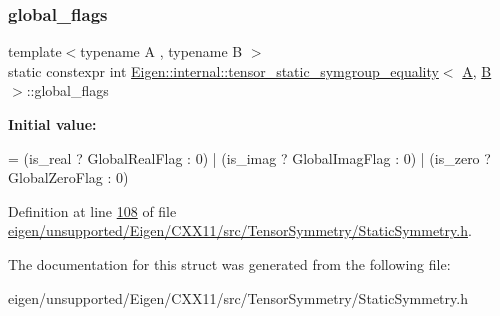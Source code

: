 \subsubsection{\texorpdfstring{global\+\_\+flags}{global\_flags}}
{\footnotesize\ttfamily template$<$typename A , typename B $>$ \\
static constexpr int \hyperlink{struct_eigen_1_1internal_1_1tensor__static__symgroup__equality}{Eigen\+::internal\+::tensor\+\_\+static\+\_\+symgroup\+\_\+equality}$<$ \hyperlink{group___core___module_class_eigen_1_1_matrix}{A}, \hyperlink{group___core___module_class_eigen_1_1_matrix}{B} $>$\+::global\+\_\+flags\hspace{0.3cm}{\ttfamily [static]}}

{\bfseries Initial value\+:}
\begin{DoxyCode}
= 
      (is\_real ? GlobalRealFlag : 0) |
      (is\_imag ? GlobalImagFlag : 0) |
      (is\_zero ? GlobalZeroFlag : 0)
\end{DoxyCode}


Definition at line \hyperlink{eigen_2unsupported_2_eigen_2_c_x_x11_2src_2_tensor_symmetry_2_static_symmetry_8h_source_l00108}{108} of file \hyperlink{eigen_2unsupported_2_eigen_2_c_x_x11_2src_2_tensor_symmetry_2_static_symmetry_8h_source}{eigen/unsupported/\+Eigen/\+C\+X\+X11/src/\+Tensor\+Symmetry/\+Static\+Symmetry.\+h}.



The documentation for this struct was generated from the following file\+:\begin{DoxyCompactItemize}
\item 
eigen/unsupported/\+Eigen/\+C\+X\+X11/src/\+Tensor\+Symmetry/\+Static\+Symmetry.\+h\end{DoxyCompactItemize}
